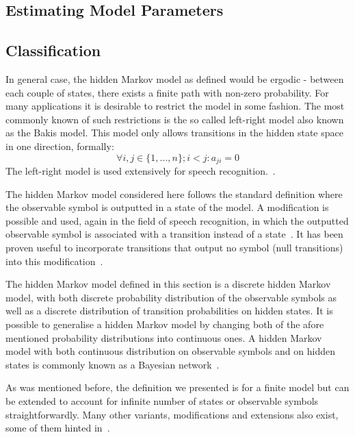 \subsection{Estimating Model Parameters}


\subsection{Classification}

In general case, the hidden Markov model as defined would be ergodic - between each couple of states, there exists a finite path with non-zero probability. For many applications it is desirable to restrict the model in some fashion. The most commonly known of such restrictions is the so called left-right model also known as the Bakis model. This model only allows transitions in the hidden state space in one direction, formally: $$\forall i,j \in \{1, ..., n\}; i < j: a_{ji} = 0$$
The left-right model is used extensively for speech recognition.~\cite{bakis1976, jelinek1976}.

The hidden Markov model considered here follows the standard definition where the observable symbol is outputted in a state of the model. A modification is possible and used, again in the field of speech recognition, in which the outputted observable symbol is associated with a transition instead of a state~\cite{Rabiner89hmm, jelinek1983}. It has been proven useful to incorporate transitions that output no symbol (null transitions) into this modification~\cite{jelinek1983}.

 The hidden Markov model defined in this section is a discrete hidden Markov model, with both discrete probability distribution of the observable symbols as well as a discrete distribution of transition probabilities on hidden states. It is possible to generalise a hidden Markov model by changing both of the afore mentioned probability distributions into continuous ones. A hidden Markov model with both continuous distribution on observable symbols and on hidden states is commonly known as a Bayesian network~\cite{ben-gal2007bn}.

As was mentioned before, the definition we presented is for a finite model but can be extended to account for infinite number of states or observable symbols straightforwardly. Many other variants, modifications and extensions also exist, some of them hinted in~\cite{Rabiner89hmm}.